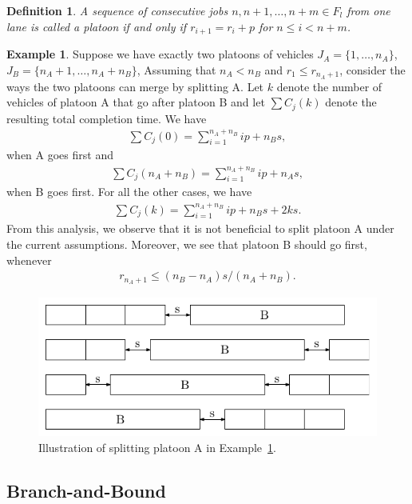 \documentclass{article}
\theoremstyle{definition}
\newtheorem{eg}{Example}[section]
\theoremstyle{plain}
\newtheorem{define}{Definition}[section]
\begin{document}
%
\begin{define}
  A sequence of consecutive jobs $n, n+1, \dots, n+m \in F_{l}$ from one lane is called a platoon if and only if $r_{i+1} = r_{i} + p$ for $n \leq i < n + m$.
\end{define}
%
\begin{eg}
  \label{example3}
  Suppose we have exactly two platoons of vehicles
  $J_{A} = \{ 1, \dots, n_{A}\}$, $J_{B} = \{ n_{A} + 1, \dots, n_{A} + n_{B}\}$,
  Assuming that
  $n_{A} < n_{B}$ and $r_{1} \leq r_{n_{A}+1}$, consider the ways the two platoons can merge by splitting A.
  Let $k$ denote the number of vehicles of platoon A that go after platoon B and
  let $\sum C_{j}(k)$ denote the resulting total completion time. We have
  \begin{align*}
    \sum C_{j}(0) = \sum_{i=1}^{n_{A}+n_{B}} ip + n_{B}s ,
  \end{align*}
  when A goes first and
  \begin{align*}
    \sum C_{j}(n_{A}+n_{B}) = \sum_{i=1}^{n_{A}+n_{B}} ip + n_{A}s ,
  \end{align*}
  when B goes first. For all the other cases, we have
  \begin{align*}
    \sum C_{j}(k) = \sum_{i=1}^{n_{A}+n_{B}} ip + n_{B}s + 2ks .
  \end{align*}
  From this analysis, we observe that it is not beneficial to split platoon A under the current assumptions. Moreover, we see that platoon B should go first, whenever
  \begin{align*}
    r_{n_{A} + 1} \leq (n_{B} - n_{A}) s / (n_{A} + n_{B}) .
  \end{align*}
\end{eg}
\begin{figure}
  \centering
  \includegraphics{platoons.pdf}
  \caption{Illustration of splitting platoon A in Example~\ref{example3}.}
  \label{fig:example3}
\end{figure}


\subsection{Branch-and-Bound}
\end{document}
